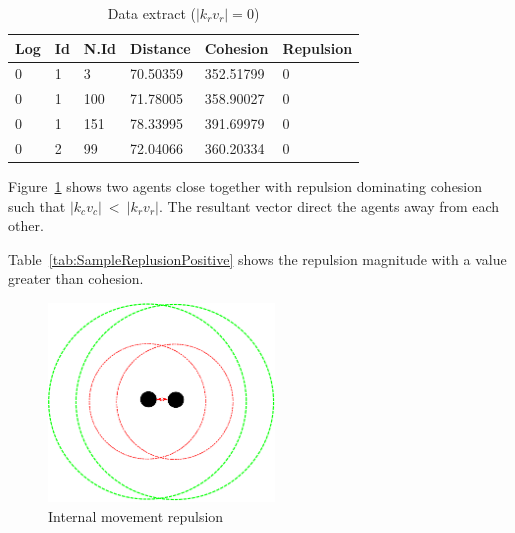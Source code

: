 \documentclass[10pt,journal,letterpaper,twoside]{IEEEtran}
\begin{document}
\begin{table}[H]
\begin{center}
\begin{tabular}{| l | l | l | l | l | l |}
\hline
Log &	Id &	N.Id &	Distance &	{\color{green}Cohesion} &	{\color{red}Repulsion} 	\\ \hline
0 &	1 &	3 	 & 70.50359 &	{\color{green}352.51799} &	{\color{red}0} \\ \hline
0 &	1 &	100 & 71.78005 &	{\color{green}358.90027} &	{\color{red}0} \\ \hline
0 &	1 &	151 & 78.33995 &	{\color{green}391.69979} &	{\color{red}0} \\ \hline
0 &	2 &	99  &	72.04066 &	{\color{green}360.20334} &	{\color{red}0} \\ 
\hline
\end{tabular}\caption{Data extract ($|k_rv_r| = 0$)} \label{tab:SampleReplusion0}
\end{center}
\end{table}

Figure~\ref{methods:Stability2} shows two agents close together with repulsion dominating cohesion such that $|k_cv_c|~<~|k_rv_r|$. The resultant vector direct the agents away from each other. 

Table~\ref{tab:SampleReplusionPositive} shows the repulsion magnitude with a value greater than cohesion.

\begin{figure}[H]
\begin{center}
\includegraphics[width=6cm]{figures/Stability2}
\end{center}
\caption{Internal movement repulsion} \label{methods:Stability2}
\end{figure}
\end{document}
